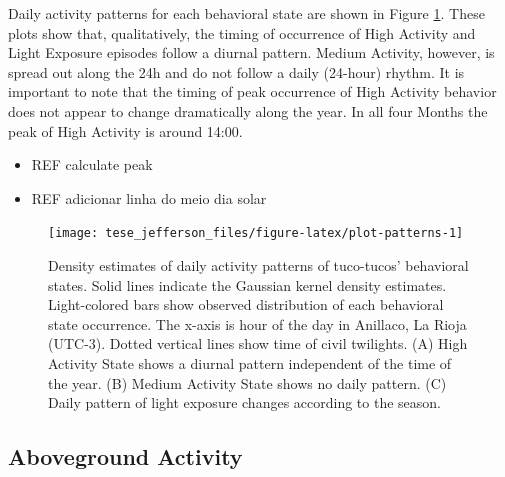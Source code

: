 \documentclass[msc,numbers,hidelinks]{coppe}
\providecommand{\tightlist}{
  \setlength{\itemsep}{0pt}\setlength{\parskip}{0pt}}
\begin{document}
  Daily activity patterns for each behavioral state are shown in Figure \ref{fig:plot-patterns}. These plots show that, qualitatively, the timing of occurrence of High Activity and Light Exposure episodes follow a diurnal pattern. Medium Activity, however, is spread out along the 24h and do not follow a daily (24-hour) rhythm. It is important to note that the timing of peak occurrence of High Activity behavior does not appear to change dramatically along the year. In all four Months the peak of High Activity is around 14:00.
  \begin{itemize}
  \tightlist
  \item
    REF calculate peak
  \item
    REF adicionar linha do meio dia solar
  \end{itemize}
  \newpage
  \begin{figure}

  {\centering \texttt{[image: tese\_jefferson\_files/figure-latex/plot-patterns-1]} 

  }

  \caption{Density estimates of daily activity patterns of tuco-tucos' behavioral states. Solid lines indicate the Gaussian kernel density estimates. Light-colored bars show observed distribution of each behavioral state occurrence. The x-axis is hour of the day in Anillaco, La Rioja (UTC-3). Dotted vertical lines show time of civil twilights. (A) High Activity State shows a diurnal pattern independent of the time of the year. (B) Medium Activity State shows no daily pattern. (C) Daily pattern of light exposure changes according to the season.}\label{fig:plot-patterns}
  \end{figure}
  \clearpage

  \hypertarget{aboveground-activity-1}{%
  \subsection{Aboveground Activity}\label{aboveground-activity-1}}
\end{document}
